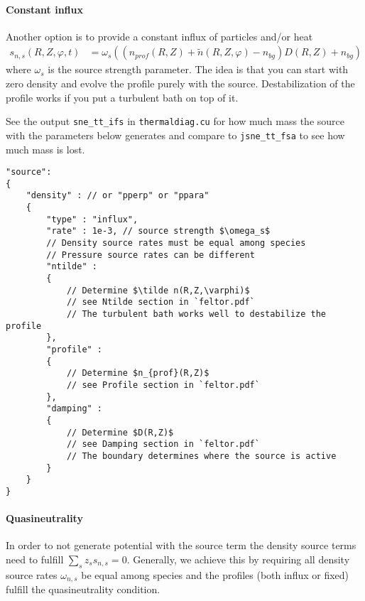 \paragraph{Constant influx}
Another option is to provide a constant influx of particles and/or heat
\begin{align}
    s_{n,s}(R,Z,\varphi, t) &= \omega_s \left( (n_{prof}(R,Z) + \tilde n(R,Z,\varphi) - n_{bg})D(R,Z) + n_{bg}\right)
\end{align}
where $\omega_s$ is the source strength parameter.
The idea is that you can start with zero density and evolve the profile purely
with the source. Destabilization of the profile works if you put a turbulent
bath on top of it.
\begin{tcolorbox}[title=Note]
    See the output \texttt{sne_tt_ifs} in \texttt{thermaldiag.cu} for how much mass
the source with the parameters below generates and compare to
\texttt{jsne_tt_fsa} to see how much mass is lost.
\end{tcolorbox}
\begin{verbatim}
"source":
{
    "density" : // or "pperp" or "ppara"
    {
        "type" : "influx",
        "rate" : 1e-3, // source strength $\omega_s$
        // Density source rates must be equal among species
        // Pressure source rates can be different
        "ntilde" :
        {
            // Determine $\tilde n(R,Z,\varphi)$
            // see Ntilde section in `feltor.pdf`
            // The turbulent bath works well to destabilize the profile
        },
        "profile" :
        {
            // Determine $n_{prof}(R,Z)$
            // see Profile section in `feltor.pdf`
        },
        "damping" :
        {
            // Determine $D(R,Z)$
            // see Damping section in `feltor.pdf`
            // The boundary determines where the source is active
        }
    }
}
\end{verbatim}

\paragraph{Quasineutrality}
In order to not generate potential with the source term the density source
terms need to fulfill $\sum_s z_s s_{n,s}  = 0$. Generally, we achieve this by
requiring all density source rates $\omega_{n,s}$ be equal among species and
the profiles (both influx or fixed) fulfill the quasineutrality condition.

